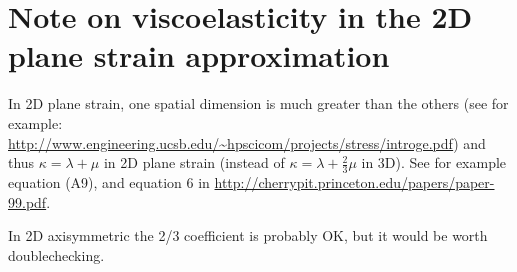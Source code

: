 \section{Note on viscoelasticity in the 2D plane strain approximation}

\noindent
In 2D plane strain, one spatial dimension is much greater than the others (see for example: \url{http://www.engineering.ucsb.edu/~hpscicom/projects/stress/introge.pdf})
and thus $\kappa = \lambda + \mu$ in 2D plane strain (instead of $\kappa = \lambda + \frac{2}{3} \mu$ in 3D).
See for example \cite{CaKoKo88b} equation (A9), and equation 6 in \url{http://cherrypit.princeton.edu/papers/paper-99.pdf}. \newline

\noindent
In 2D axisymmetric the 2/3 coefficient is probably OK, but it would be worth doublechecking.

